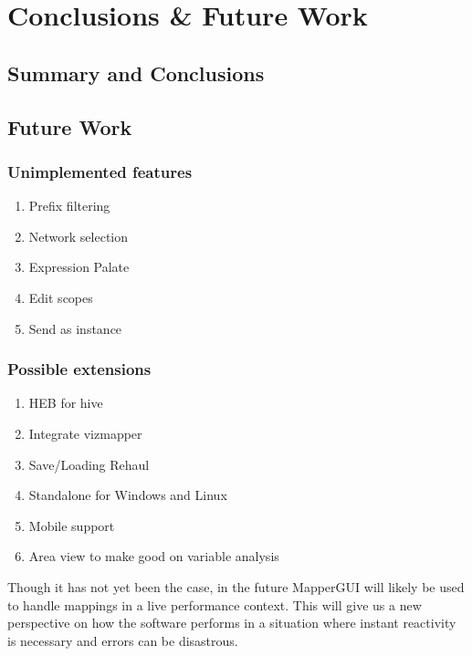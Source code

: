 \chapter{Conclusions \& Future Work}

\section{Summary and Conclusions}

\section{Future Work}
	\subsection{Unimplemented features}
	\begin{enumerate}
		\item Prefix filtering
		\item Network selection
		\item Expression Palate 
		\item Edit scopes
		\item Send as instance
	\end{enumerate}
	\subsection{Possible extensions} %
	\label{sub:possible_extensions}
	\begin{enumerate}
		\item HEB for hive
		\item Integrate vizmapper
		\item Save/Loading Rehaul
		\item Standalone for Windows and Linux
		\item Mobile support
		\item Area view to make good on variable analysis
	\end{enumerate}

	
Though it has not yet been the case, in the future MapperGUI will likely be used to handle mappings in a live performance context. This will give us a new perspective on how the software performs in a situation where instant reactivity is necessary and errors can be disastrous. 